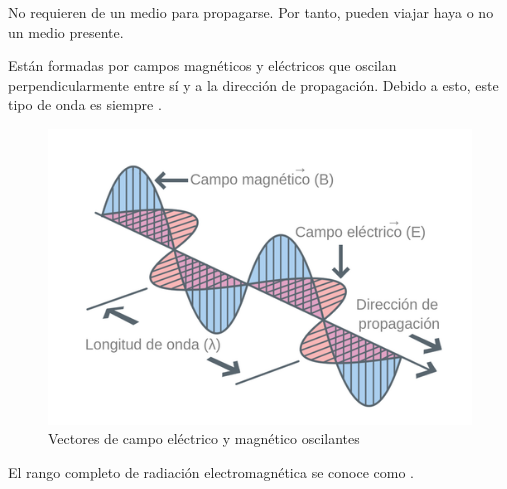 No requieren de un medio para propagarse. Por tanto, pueden viajar haya o no un medio presente.

Están formadas por campos magnéticos y eléctricos que oscilan perpendicularmente entre sí y a la dirección de propagación. Debido a esto, este tipo de onda es siempre \transversal.

\begin{figure}[H]
  \centering
  \includegraphics[scale=0.5]{imagenes/campo_electrico_magnetico.png}
  \caption{Vectores de campo eléctrico y magnético oscilantes\cite{labstercampoelcmag}}
\end{figure}

El rango completo de radiación electromagnética se conoce como \EspectroElectromagnetico.
